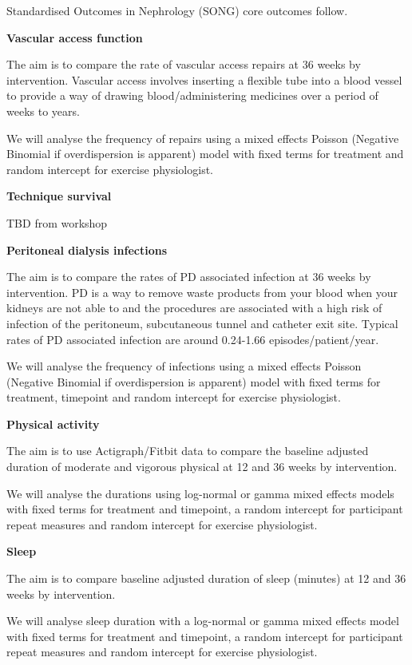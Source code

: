 \documentclass[
]{article}
\begin{document}
Standardised Outcomes in Nephrology (SONG) core outcomes follow.

\textbf{Vascular access function}

The aim is to compare the rate of vascular access repairs at 36 weeks by intervention.
Vascular access involves inserting a flexible tube into a blood vessel to provide a way of drawing blood/administering medicines over a period of weeks to years.

We will analyse the frequency of repairs using a mixed effects Poisson (Negative Binomial if overdispersion is apparent) model with fixed terms for treatment and random intercept for exercise physiologist.

\textbf{Technique survival}

TBD from workshop

\textbf{Peritoneal dialysis infections}

The aim is to compare the rates of PD associated infection at 36 weeks by intervention.
PD is a way to remove waste products from your blood when your kidneys are not able to and the procedures are associated with a high risk of infection of the peritoneum, subcutaneous tunnel and catheter exit site.
Typical rates of PD associated infection are around 0.24-1.66 episodes/patient/year.

We will analyse the frequency of infections using a mixed effects Poisson (Negative Binomial if overdispersion is apparent) model with fixed terms for treatment, timepoint and random intercept for exercise physiologist.

\textbf{Physical activity}

The aim is to use Actigraph/Fitbit data to compare the baseline adjusted duration of moderate and vigorous physical at 12 and 36 weeks by intervention.

We will analyse the durations using log-normal or gamma mixed effects models with fixed terms for treatment and timepoint, a random intercept for participant repeat measures and random intercept for exercise physiologist.

\textbf{Sleep}

The aim is to compare baseline adjusted duration of sleep (minutes) at 12 and 36 weeks by intervention.

We will analyse sleep duration with a log-normal or gamma mixed effects model with fixed terms for treatment and timepoint, a random intercept for participant repeat measures and random intercept for exercise physiologist.
\end{document}
